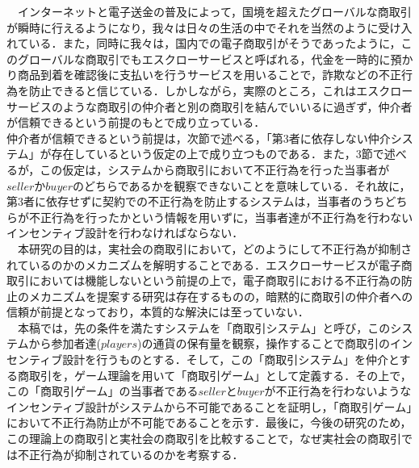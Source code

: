 \documentclass[twocolumn, a4j]{article}
\begin{document}
  　インターネットと電子送金の普及によって，国境を超えたグローバルな商取引が瞬時に行えるようになり，我々は日々の生活の中でそれを当然のように受け入れている．また，同時に我々は，国内での電子商取引がそうであったように，このグローバルな商取引でもエスクローサービスと呼ばれる，代金を一時的に預かり商品到着を確認後に支払いを行うサービスを用いることで，詐欺などの不正行為を防止できると信じている．しかしながら，実際のところ，これはエスクローサービスのような商取引の仲介者と別の商取引を結んでいいるに過ぎず，仲介者が信頼できるという前提のもとで成り立っている．\\
   仲介者が信頼できるという前提は，次節で述べる，「第3者に依存しない仲介システム」が存在しているという仮定の上で成り立つものである．また，3節で述べるが，この仮定は，システムから商取引において不正行為を行った当事者が$seller$か$buyer$のどちらであるかを観察できないことを意味している．それ故に，第3者に依存せずに契約での不正行為を防止するシステムは，当事者のうちどちらが不正行為を行ったかという情報を用いずに，当事者達が不正行為を行わないインセンティブ設計を行わなければならない．\\
  　本研究の目的は，実社会の商取引において，どのようにして不正行為が抑制されているのかのメカニズムを解明することである．エスクローサービスが電子商取引においては機能しないという前提の上で，電子商取引における不正行為の防止のメカニズムを提案する研究\cite{Shigeo 2000}は存在するものの，暗黙的に商取引の仲介者への信頼が前提となっており，本質的な解決には至っていない．\\
  　本稿では，先の条件を満たすシステムを「商取引システム」と呼び，このシステムから参加者達($players$)の通貨の保有量を観察，操作することで商取引のインセンティブ設計を行うものとする．そして，この「商取引システム」を仲介とする商取引を，ゲーム理論を用いて「商取引ゲーム」として定義する．その上で，この「商取引ゲーム」の当事者である$seller$と$buyer$が不正行為を行わないようなインセンティブ設計がシステムから不可能であることを証明し，「商取引ゲーム」において不正行為防止が不可能であることを示す．最後に，今後の研究のため，この理論上の商取引と実社会の商取引を比較することで，なぜ実社会の商取引では不正行為が抑制されているのかを考察する．\\
\end{document}
